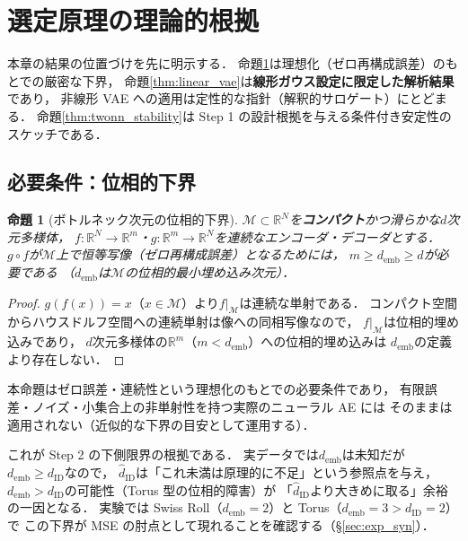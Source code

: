 \documentclass[11pt,a4paper]{jsarticle}
\newtheorem{proposition}{命題}
\newcommand{\dID}{d_{\mathrm{ID}}}
\newcommand{\hatdID}{\hat{d}_{\mathrm{ID}}}
\newcommand{\R}{\mathbb{R}}
\newcommand{\demb}{d_{\mathrm{emb}}}
\begin{document}
\section{選定原理の理論的根拠}\label{sec:theory}

本章の結果の位置づけを先に明示する．
命題\ref{thm:lower_bound}は理想化（ゼロ再構成誤差）のもとでの厳密な下界，
命題\ref{thm:linear_vae}は\textbf{線形ガウス設定に限定した解析結果}であり，
非線形 VAE への適用は定性的な指針（解釈的サロゲート）にとどまる．
命題\ref{thm:twonn_stability}は Step 1 の設計根拠を与える条件付き安定性のスケッチである．

\subsection{必要条件：位相的下界}\label{sec:theory_lower}

\begin{proposition}[ボトルネック次元の位相的下界]\label{thm:lower_bound}
$\mathcal{M} \subset \R^N$を\textbf{コンパクト}かつ滑らかな$d$次元多様体，
$f: \R^N \to \R^m$・$g: \R^m \to \R^N$を連続なエンコーダ・デコーダとする．
$g \circ f$が$\mathcal{M}$上で恒等写像（ゼロ再構成誤差）となるためには，
$m \geq \demb \geq d$が必要である
（$\demb$は$\mathcal{M}$の位相的最小埋め込み次元）．
\end{proposition}

\begin{proof}
$g(f(x)) = x$（$x \in \mathcal{M}$）より$f|_\mathcal{M}$は連続な単射である．
コンパクト空間からハウスドルフ空間への連続単射は像への同相写像なので，
$f|_\mathcal{M}$は位相的埋め込みであり，
$d$次元多様体の$\R^m$（$m < \demb$）への位相的埋め込みは
$\demb$の定義より存在しない\cite{hatcher2002algebraic}．
\end{proof}

本命題はゼロ誤差・連続性という理想化のもとでの必要条件であり，
有限誤差・ノイズ・小集合上の非単射性を持つ実際のニューラル AE には
そのままは適用されない（近似的な下界の目安として運用する）．

これが Step 2 の下側限界の根拠である．
実データでは$\demb$は未知だが$\demb \geq \dID$なので，
$\hatdID$は「これ未満は原理的に不足」という参照点を与え，
$\demb > \dID$の可能性（Torus 型の位相的障害）が
「$\hatdID$より大きめに取る」余裕の一因となる．
実験では Swiss Roll（$\demb = 2$）と Torus（$\demb = 3 > \dID = 2$）で
この下界が MSE の肘点として現れることを確認する（§\ref{sec:exp_syn}）．
\end{document}
